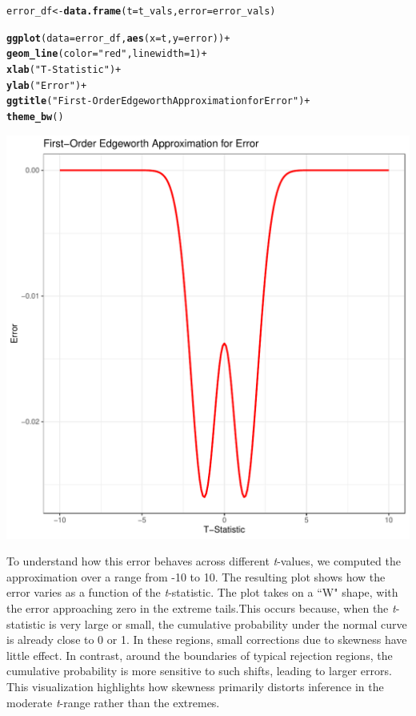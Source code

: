 \documentclass{article}\usepackage[]{graphicx}\usepackage[]{xcolor}
\makeatletter
\def\maxwidth{ %
  \ifdim\Gin@nat@width>\linewidth
    \linewidth
  \else
    \Gin@nat@width
  \fi
}
\newcommand{\hlnum}[1]{\textcolor[rgb]{0.686,0.059,0.569}{#1}}%
\newcommand{\hlsng}[1]{\textcolor[rgb]{0.192,0.494,0.8}{#1}}%
\newcommand{\hlopt}[1]{\textcolor[rgb]{0,0,0}{#1}}%
\newcommand{\hldef}[1]{\textcolor[rgb]{0.345,0.345,0.345}{#1}}%
\newcommand{\hlkwb}[1]{\textcolor[rgb]{0.69,0.353,0.396}{#1}}%
\newcommand{\hlkwc}[1]{\textcolor[rgb]{0.333,0.667,0.333}{#1}}%
\newcommand{\hlkwd}[1]{\textcolor[rgb]{0.737,0.353,0.396}{\textbf{#1}}}%
\newenvironment{kframe}{%
 \def\at@end@of@kframe{}%
 \ifinner\ifhmode%
  \def\at@end@of@kframe{\end{minipage}}%
  \begin{minipage}{\columnwidth}%
 \fi\fi%
 \def\FrameCommand##1{\hskip\@totalleftmargin \hskip-\fboxsep
 \colorbox{shadecolor}{##1}\hskip-\fboxsep
     \hskip-\linewidth \hskip-\@totalleftmargin \hskip\columnwidth}%
 \MakeFramed {\advance\hsize-\width
   \@totalleftmargin\z@ \linewidth\hsize
   \@setminipage}}%
 {\par\unskip\endMakeFramed%
 \at@end@of@kframe}
\newenvironment{knitrout}{}{} %
\makeatother
\begin{document}
\begin{enumerate}
\begin{enumerate}
\begin{knitrout}
\begin{kframe}
\begin{alltt}
\hldef{error_df} \hlkwb{<-} \hlkwd{data.frame}\hldef{(}\hlkwc{t}\hldef{=t_vals,} \hlkwc{error}\hldef{=error_vals)}

\hlkwd{ggplot}\hldef{(}\hlkwc{data} \hldef{= error_df,} \hlkwd{aes}\hldef{(}\hlkwc{x}\hldef{=t,} \hlkwc{y}\hldef{=error))} \hlopt{+}
  \hlkwd{geom_line}\hldef{(}\hlkwc{color}\hldef{=}\hlsng{"red"}\hldef{,} \hlkwc{linewidth}\hldef{=}\hlnum{1}\hldef{)} \hlopt{+}
  \hlkwd{xlab}\hldef{(}\hlsng{"T-Statistic"}\hldef{)} \hlopt{+}
  \hlkwd{ylab}\hldef{(}\hlsng{"Error"}\hldef{)} \hlopt{+}
  \hlkwd{ggtitle}\hldef{(}\hlsng{"First-Order Edgeworth Approximation for Error"}\hldef{)} \hlopt{+}
  \hlkwd{theme_bw}\hldef{()}
\end{alltt}
\end{kframe}
\includegraphics[width=\maxwidth]{figure/unnamed-chunk-3-1} 
\end{knitrout}



To understand how this error behaves across different \emph{t}-values, we computed the 
approximation over a range from -10 to 10. The resulting plot shows how the error
varies as a function of the \emph{t}-statistic. The plot takes on a ``W" shape, with
the error approaching zero in the extreme tails.This occurs because, when the 
\emph{t}-statistic is very large or small, the cumulative probability under the
normal curve is already close to 0 or 1. In these regions, small corrections due
to skewness have little effect. In contrast, around the boundaries of typical
rejection regions, the cumulative probability is more sensitive to such shifts,
leading to larger errors. This visualization highlights how skewness primarily
distorts inference in the moderate \emph{t}-range rather than the extremes.



\end{enumerate}
\end{enumerate}
\end{document}
